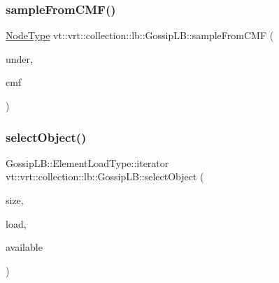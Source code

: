 \subsubsection{\texorpdfstring{sample\+From\+C\+M\+F()}{sampleFromCMF()}}
{\footnotesize\ttfamily \hyperlink{namespacevt_a866da9d0efc19c0a1ce79e9e492f47e2}{Node\+Type} vt\+::vrt\+::collection\+::lb\+::\+Gossip\+L\+B\+::sample\+From\+C\+MF (\begin{DoxyParamCaption}\item[{\hyperlink{structvt_1_1vrt_1_1collection_1_1lb_1_1_gossip_l_b_abb53f1d4bd3c37f3e68c3b5b0e1f1c86}{Node\+Set\+Type} const \&}]{under,  }\item[{std\+::vector$<$ double $>$ const \&}]{cmf }\end{DoxyParamCaption})\hspace{0.3cm}{\ttfamily [protected]}}

\mbox{\label{structvt_1_1vrt_1_1collection_1_1lb_1_1_gossip_l_b_adafa0d7c3295e095149f48c3027b3173}} 
\subsubsection{\texorpdfstring{select\+Object()}{selectObject()}}
{\footnotesize\ttfamily Gossip\+L\+B\+::\+Element\+Load\+Type\+::iterator vt\+::vrt\+::collection\+::lb\+::\+Gossip\+L\+B\+::select\+Object (\begin{DoxyParamCaption}\item[{\hyperlink{structvt_1_1vrt_1_1collection_1_1lb_1_1_base_l_b_a215e22b9f12678303f49615ae3be05cc}{Load\+Type}}]{size,  }\item[{\hyperlink{structvt_1_1vrt_1_1collection_1_1lb_1_1_base_l_b_aa286d31a0820a8fc9218ccb858368fca}{Element\+Load\+Type} \&}]{load,  }\item[{std\+::set$<$ \hyperlink{structvt_1_1vrt_1_1collection_1_1lb_1_1_base_l_b_a15a2f756b59c8c2437985206b32aa403}{Obj\+I\+D\+Type} $>$ const \&}]{available }\end{DoxyParamCaption})\hspace{0.3cm}{\ttfamily [protected]}}

\mbox{\label{structvt_1_1vrt_1_1collection_1_1lb_1_1_gossip_l_b_a7693c8b06ab78ef3565687621d810450}} 
